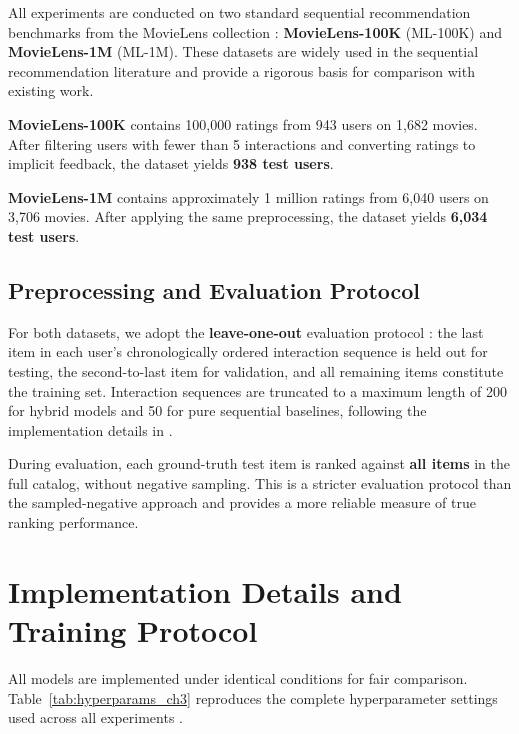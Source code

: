\documentclass[12pt,a4paper]{report}
\newcommand{\parencite}[1]{\citep{#1}}
\begin{document}
All experiments are conducted on two standard sequential recommendation benchmarks from the MovieLens collection \parencite{harper2015movielens}: \textbf{MovieLens-100K} (ML-100K) and \textbf{MovieLens-1M} (ML-1M). These datasets are widely used in the sequential recommendation literature \parencite{kang2018self, sun2019bert4rec, he2020lightgcn} and provide a rigorous basis for comparison with existing work.

\textbf{MovieLens-100K} contains 100,000 ratings from 943 users on 1,682 movies. After filtering users with fewer than 5 interactions and converting ratings to implicit feedback, the dataset yields \textbf{938 test users}.

\textbf{MovieLens-1M} contains approximately 1 million ratings from 6,040 users on 3,706 movies. After applying the same preprocessing, the dataset yields \textbf{6,034 test users}.

\subsection{Preprocessing and Evaluation Protocol}

For both datasets, we adopt the \textbf{leave-one-out} evaluation protocol \parencite{kang2018self}: the last item in each user's chronologically ordered interaction sequence is held out for testing, the second-to-last item for validation, and all remaining items constitute the training set. Interaction sequences are truncated to a maximum length of 200 for hybrid models and 50 for pure sequential baselines, following the implementation details in \parencite{ouledmeriem2025hybrid}.

During evaluation, each ground-truth test item is ranked against \textbf{all items} in the full catalog, without negative sampling. This is a stricter evaluation protocol than the sampled-negative approach and provides a more reliable measure of true ranking performance.

\section{Implementation Details and Training Protocol}

All models are implemented under identical conditions for fair comparison. Table~\ref{tab:hyperparams_ch3} reproduces the complete hyperparameter settings used across all experiments \parencite{ouledmeriem2025hybrid}.
\end{document}

